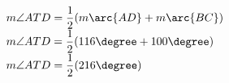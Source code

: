 {\begin{minipage}{\textwidth}
{\begin{enumerate}[label = \arabic*. ]
$ m\angle{ATD}=\dfrac{1}{2}(m\arc{AD}+m\arc{BC})  $ \redcheck \\
$ m\angle{ATD}=\dfrac{1}{2}(116 \degree +100 \degree )  $ \redcheck \\
$ m\angle{ATD}=\dfrac{1}{2}(216 \degree )  $ \redcheck \\
 \redcheck 

\end{enumerate}  


}
\end{minipage}}

